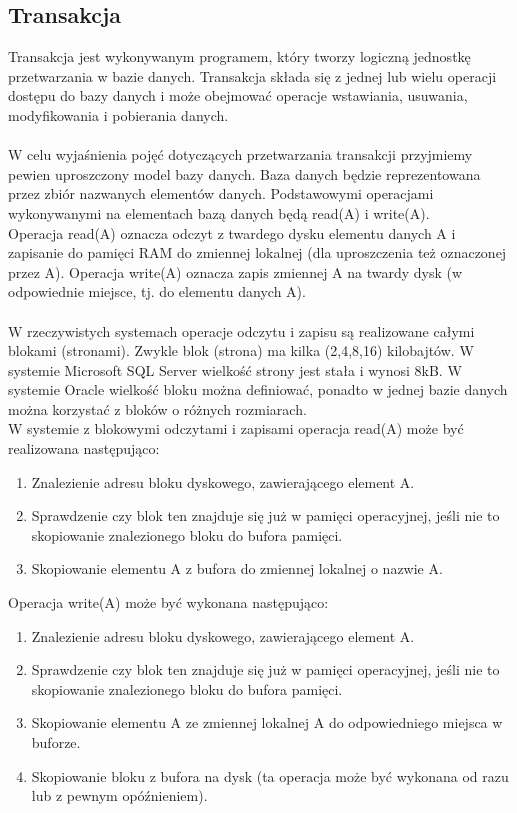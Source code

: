 \documentclass[12pt]{article}
\begin{document}
    \subsection{Transakcja}
    Transakcja jest wykonywanym programem, który tworzy logiczną jednostkę przetwarzania w
    bazie danych. Transakcja składa się z jednej lub wielu operacji dostępu do bazy danych i może
    obejmować operacje wstawiania, usuwania, modyfikowania i pobierania danych.
    \\\\
    W celu wyjaśnienia pojęć dotyczących przetwarzania transakcji przyjmiemy pewien uproszczony
    model bazy danych. Baza danych będzie reprezentowana przez zbiór nazwanych elementów
    danych. Podstawowymi operacjami wykonywanymi na elementach bazą danych będą read(A) i
    write(A).
    \\
    Operacja read(A) oznacza odczyt z twardego dysku elementu danych A i zapisanie do pamięci
    RAM do zmiennej lokalnej (dla uproszczenia też oznaczonej przez A). Operacja write(A) oznacza
    zapis zmiennej A na twardy dysk (w odpowiednie miejsce, tj. do elementu danych A).
    \\\\
    W rzeczywistych systemach operacje odczytu i zapisu są realizowane całymi blokami (stronami).
    Zwykle blok (strona) ma kilka (2,4,8,16) kilobajtów. W systemie Microsoft SQL Server wielkość
    strony jest stała i wynosi 8kB. W systemie Oracle wielkość bloku można definiować, ponadto w
    jednej bazie danych można korzystać z bloków o różnych rozmiarach.\\
    
    W systemie z blokowymi odczytami i zapisami operacja read(A) może być realizowana   
    następująco:
    \begin{enumerate}
        \item Znalezienie adresu bloku dyskowego, zawierającego element A.
        \item Sprawdzenie czy blok ten znajduje się już w pamięci operacyjnej, jeśli nie to skopiowanie
        znalezionego bloku do bufora pamięci.
        \item Skopiowanie elementu A z bufora do zmiennej lokalnej o nazwie A.
    \end{enumerate}
    
    Operacja write(A) może być wykonana następująco:
    \begin{enumerate}
        \item Znalezienie adresu bloku dyskowego, zawierającego element A.
        \item Sprawdzenie czy blok ten znajduje się już w pamięci operacyjnej, jeśli nie to skopiowanie
        znalezionego bloku do bufora pamięci.
        \item Skopiowanie elementu A ze zmiennej lokalnej A do odpowiedniego miejsca w buforze.
        \item Skopiowanie bloku z bufora na dysk (ta operacja może być wykonana od razu lub z
        pewnym opóźnieniem).
    \end{enumerate}
    
\end{document}
